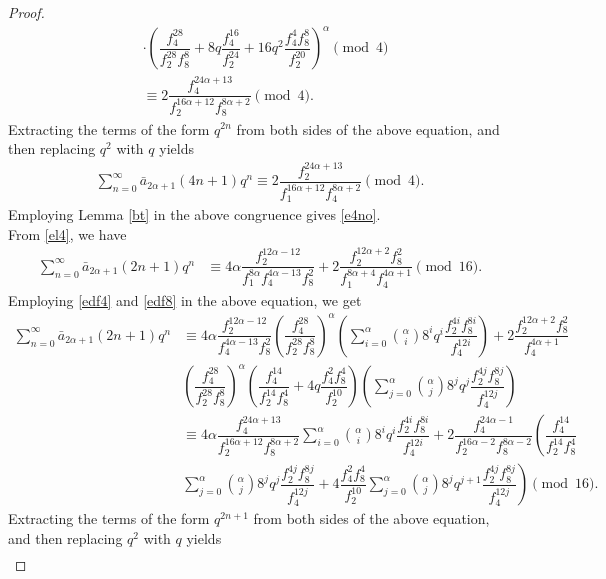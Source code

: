 \documentclass[11pt,a4paper]{article}
\numberwithin{equation}{section}
\theoremstyle{plain}
\begin{document}
\begin{proof}
\begin{align}
&\cdot\left(\dfrac{f_4^{28}}{f_2^{28}f_8^8}+8q\dfrac{f_4^{16}}{f_2^{24}}+16q^2 \dfrac{f_4^4f_8^8}{f_2^{20}}\right)^\alpha\pmod 4\label{el6}\\
&\equiv 2 \dfrac{f_4^{24\alpha+13}}{f_2^{16\alpha+12}f_8^{8\alpha+2}}
\pmod4.\nonumber
\end{align}
	Extracting the terms of the form $q^{2n}$ from both sides of the above equation, and then replacing $q^{2}$ with $q$ yields
\begin{align}\label{el5}
\sum_{n=0}^{\infty}\bar{a}_{2\alpha+1}(4n+1)q^n\equiv 2\dfrac{f_2^{24\alpha+13}}{f_1^{16\alpha+12}f_4^{8\alpha+2}}\pmod 4.
\end{align}
	Employing Lemma \ref{bt} in the above congruence gives \eqref{e4no}.\\
	\indent From \eqref{el4}, we have
	\begin{align*}
	\sum_{n=0}^{\infty}\bar{a}_{2\alpha+1}(2n+1)q^n
	&\equiv 4\alpha\dfrac{f_2^{12\alpha-12}}{f_1^{8\alpha}f_4^{4\alpha-13}f_8^2}+2\dfrac{f_2^{12\alpha+2}f_8^2}{f_1^{8\alpha+4}f_4^{4\alpha+1}}\pmod {16}.
	\end{align*}
	Employing \eqref{edf4} and \eqref{edf8} in the above equation, we get
	\begin{align*}
	\sum_{n=0}^{\infty}\bar{a}_{2\alpha+1}(2n+1)q^n&\equiv 4\alpha\dfrac{f_2^{12\alpha-12}}{f_4^{4\alpha-13}f_8^2}\left(\dfrac{f_4^{28}}{f_2^{28}f_8^8}\right)^\alpha\left(\sum_{i=0}^{\alpha}\binom{\alpha}{i}8^iq^i\dfrac{f_2^{4i}f_8^{8i}}{f_4^{12i}}\right)+2\dfrac{f_2^{12\alpha+2}f_8^2}{f_4^{4\alpha+1}}\\
	&\left(\dfrac{f_4^{28}}{f_2^{28}f_8^{8}}\right)^\alpha\left(\dfrac{f_4^{14}}{f_2^{14}f_8^4}+4q\dfrac{f_4^2f_8^4}{f_2^{10}}\right)\left(\sum_{j=0}^{\alpha}\binom{\alpha}{j}8^jq^j\dfrac{f_2^{4j}f_8^{8j}}{f_4^{12j}}\right)\\
	&\equiv 4\alpha\dfrac{f_4^{24\alpha+13}}{f_2^{16\alpha+12}f_8^{8\alpha+2}}\sum_{i=0}^{\alpha}\binom{\alpha}{i}8^iq^i\dfrac{f_2^{4i}f_8^{8i}}{f_4^{12i}}+2\dfrac{f_4^{24\alpha-1}}{f_2^{16\alpha-2}f_8^{8\alpha-2}}\left(\dfrac{f_4^{14}}{f_2^{14}f_8^4}\right.\\
	&\left.\sum_{j=0}^{\alpha}\binom{\alpha}{j}8^jq^j\dfrac{f_2^{4j}f_8^{8j}}{f_4^{12j}}+4\dfrac{f_4^2f_8^4}{f_2^{10}}\sum_{j=0}^{\alpha}\binom{\alpha}{j}8^jq^{j+1}\dfrac{f_2^{4j}f_8^{8j}}{f_4^{12j}}\right)\pmod{16}.
	\end{align*}
		Extracting the terms of the form $q^{2n+1}$ from both sides of the above equation, and then replacing $q^{2}$ with $q$ yields
	\begin{align}\label{el7}

\end{align}
\end{proof}
\end{document}
